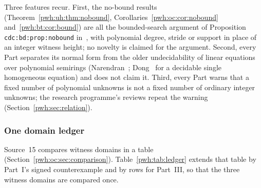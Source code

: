 \documentclass[11pt,letterpaper]{article}
\numberwithin{equation}{section}
\theoremstyle{definition}
\begin{document}
Three features recur. First, the no-bound results
(Theorem~\ref{pwh:uh:thm:nobound}, Corollaries~\ref{pwh:oc:cor:nobound}
and~\ref{pwh:bt:cor:bound}) are all the bounded-search argument of
Proposition \texttt{cdc:bd:prop:nobound} in~\cite{cdc}, with polynomial
degree, stride or support in place of an integer witness height; no novelty
is claimed for the argument. Second, every Part separates its normal form
from the older undecidability of linear equations over polynomial semirings
(Narendran~\cite{uh:Narendran}; Dong~\cite{uh:Dong} for a decidable single
homogeneous equation) and does not claim it. Third, every Part warns that a
fixed number of polynomial unknowns is not a fixed number of ordinary
integer unknowns; the research programme's reviews repeat the warning
(Section~\ref{pwh:sec:relation}).

\subsubsection*{One domain ledger}

Source~15 compares witness domains in a table (Section~\ref{pwh:oc:sec:comparison}).
Table~\ref{pwh:tab:ledger} extends that table by Part~I's signed
counterexample and by rows for Part~III, so that the three witness domains
are compared once.
\end{document}
